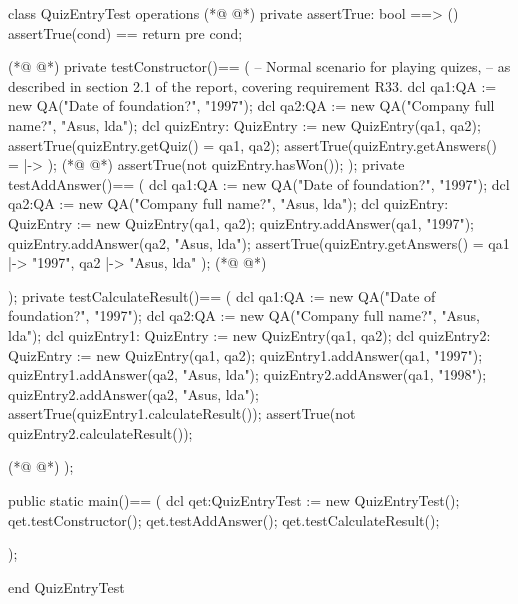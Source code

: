\begin{vdmpp}[breaklines=true]
class QuizEntryTest
 operations
(*@
\label{assertTrue:3}
@*)
  private assertTrue: bool ==> ()
    assertTrue(cond) == return
    pre cond;
    
(*@
\label{testConstructor:7}
@*)
  private testConstructor()==
  (
    -- Normal scenario for playing quizes,
     -- as described in section 2.1 of the report, covering requirement R33.
   dcl qa1:QA := new QA("Date of foundation?", "1997");
   dcl qa2:QA := new QA("Company full name?", "Asus, lda");
   dcl quizEntry: QuizEntry := new QuizEntry({qa1, qa2});
   assertTrue(quizEntry.getQuiz() = {qa1, qa2});
   assertTrue(quizEntry.getAnswers() = { |-> });
(*@
\label{testAddAnswer:16}
@*)
   assertTrue(not quizEntry.hasWon());
  );
  private testAddAnswer()==
  (
   dcl qa1:QA := new QA("Date of foundation?", "1997");
   dcl qa2:QA := new QA("Company full name?", "Asus, lda");
   dcl quizEntry: QuizEntry := new QuizEntry({qa1, qa2});
   quizEntry.addAnswer(qa1, "1997");
   quizEntry.addAnswer(qa2, "Asus, lda");
   assertTrue(quizEntry.getAnswers() = { qa1 |-> "1997", qa2 |-> "Asus, lda" });
(*@
\label{testCalculateResult:26}
@*)
   
  );
  private testCalculateResult()==
  (
   dcl qa1:QA := new QA("Date of foundation?", "1997");
   dcl qa2:QA := new QA("Company full name?", "Asus, lda");
   dcl quizEntry1: QuizEntry := new QuizEntry({qa1, qa2});
   dcl quizEntry2: QuizEntry := new QuizEntry({qa1, qa2});
   quizEntry1.addAnswer(qa1, "1997");
   quizEntry1.addAnswer(qa2, "Asus, lda");
   quizEntry2.addAnswer(qa1, "1998");
   quizEntry2.addAnswer(qa2, "Asus, lda");
   assertTrue(quizEntry1.calculateResult());
   assertTrue(not quizEntry2.calculateResult());
   
(*@
\label{main:41}
@*)
  );
  
  public static main()==
    (
   dcl qet:QuizEntryTest := new QuizEntryTest();
   qet.testConstructor();
   qet.testAddAnswer();
   qet.testCalculateResult();

    );
     
end QuizEntryTest
\end{vdmpp}
